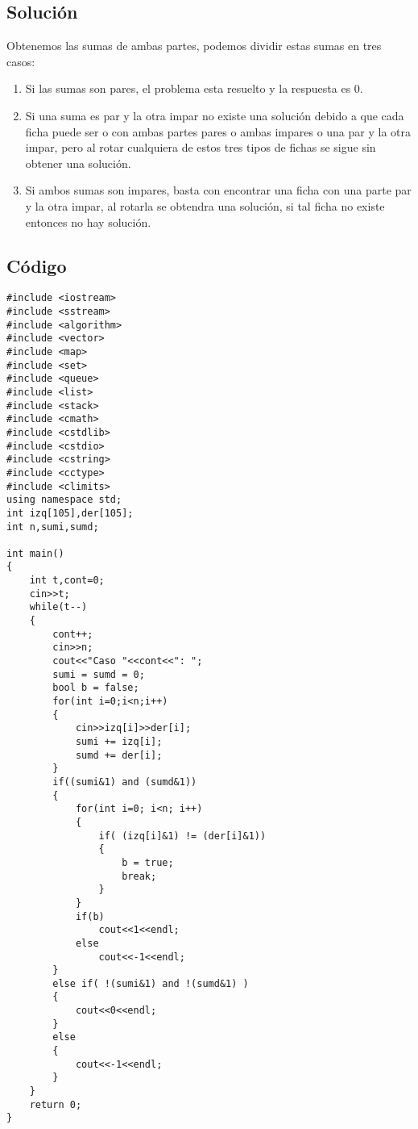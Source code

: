 \subsection*{Solución}
Obtenemos las sumas de ambas partes, podemos dividir estas sumas en tres casos:
\begin{enumerate}
\item Si las sumas son pares, el problema esta resuelto y la respuesta es 0.
\item Si una suma es par y la otra impar no existe una solución debido a que cada ficha puede ser o con ambas partes pares o ambas impares o una par y la otra impar, pero al rotar cualquiera de estos tres tipos de fichas se sigue sin obtener una solución.
\item Si ambos sumas son impares, basta con encontrar una ficha con una parte par y la otra impar, al rotarla se obtendra una solución, si tal ficha no existe entonces no hay solución.
\end{enumerate}
\subsection*{Código}

\begin{verbatim}
#include <iostream>
#include <sstream>
#include <algorithm>
#include <vector>
#include <map>
#include <set>
#include <queue>
#include <list>
#include <stack>
#include <cmath>
#include <cstdlib>
#include <cstdio>
#include <cstring>
#include <cctype>
#include <climits>
using namespace std;
int izq[105],der[105];
int n,sumi,sumd;
 
int main()
{
    int t,cont=0;
    cin>>t;
    while(t--)
    {
        cont++;
        cin>>n;
        cout<<"Caso "<<cont<<": ";
        sumi = sumd = 0;
        bool b = false;
        for(int i=0;i<n;i++)
        {
            cin>>izq[i]>>der[i];
            sumi += izq[i];
            sumd += der[i];
        }
        if((sumi&1) and (sumd&1))
        {
            for(int i=0; i<n; i++)
            {
                if( (izq[i]&1) != (der[i]&1))
                {
                    b = true;
                    break;
                }
            }
            if(b)
                cout<<1<<endl;
            else
                cout<<-1<<endl;
        }
        else if( !(sumi&1) and !(sumd&1) )
        {
            cout<<0<<endl;
        }
        else
        {
            cout<<-1<<endl;
        }
    }
    return 0;
}
\end{verbatim}





